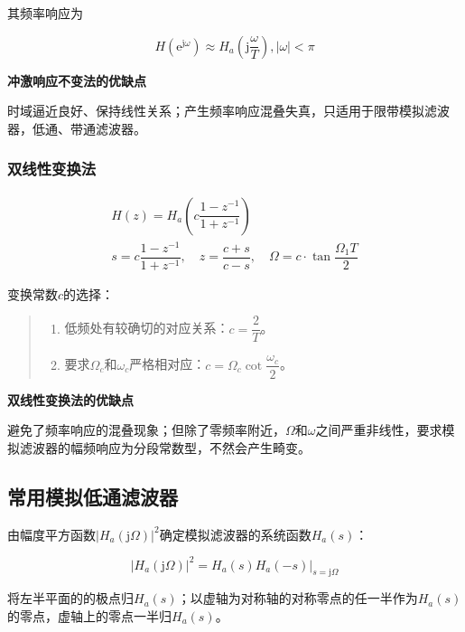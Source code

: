 \documentclass[cn, hazy, blue, normal, 14pt]{elegantnote}
\begin{document}
其频率响应为

\begin{equation}
    H(\text{e}^{\text{j}\omega})\approx H_a\left(\text{j}\frac{\omega}{T}\right), |\omega|<\pi
\end{equation}

\textbf{冲激响应不变法的优缺点}

时域逼近良好、保持线性关系；产生频率响应混叠失真，只适用于限带模拟滤波器，低通、带通滤波器。

\subsubsection{双线性变换法}

\begin{equation}
    \begin{array}{cc}
    H(z)=H_a\left(c\dfrac{1-z^{-1}}{1+z^{-1}}\right)\\
    s=c\dfrac{1-z^{-1}}{1+z^{-1}}, \quad z=\dfrac{c+s}{c-s}, \quad \Omega=c\cdot\tan\dfrac{\Omega_1 T}{2}
    \end{array}
\end{equation}

变换常数$c$的选择：

\begin{quote}
\begin{enumerate}
    \item 低频处有较确切的对应关系：$c=\dfrac{2}{T}$。
    \item 要求$\Omega_c$和$\omega_c$严格相对应：$c=\Omega_c\cot\dfrac{\omega_c}{2}$。
\end{enumerate}
\end{quote}

\textbf{双线性变换法的优缺点}

避免了频率响应的混叠现象；但除了零频率附近，$\Omega$和$\omega$之间严重非线性，要求模拟滤波器的幅频响应为分段常数型，不然会产生畸变。

\subsection{常用模拟低通滤波器}

由幅度平方函数$|H_a(\text{j}\Omega)|^2$确定模拟滤波器的系统函数$H_a(s)$：

\begin{equation}
    |H_a(\text{j}\Omega)|^2=H_a(s)H_a(-s)|_{s=\text{j}\Omega}
\end{equation}

将左半平面的的极点归$H_a(s)$；以虚轴为对称轴的对称零点的任一半作为$H_a(s)$的零点，虚轴上的零点一半归$H_a(s)$。
\end{document}
